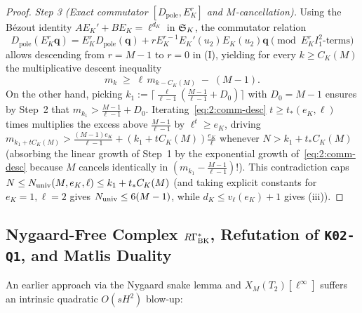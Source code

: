 \begin{proof}
\emph{Step 3 (Exact commutator $[D_{\mathrm{pole}}, E_K^r]$ and $M$-cancellation).} Using the B\'ezout identity $A E_K' + B E_K = \ell^{d_K}$ in $\mathfrak{S}_K$, the commutator relation
\[
  D_{\mathrm{pole}}(E_K^r \mathbf{q}) = E_K^r D_{\mathrm{pole}}(\mathbf{q}) + r E_K^{r-1} E_K'(u_2) E_K(u_2)\mathbf{q} \pmod{E_K^r I_1^2\text{-terms}}
\]
allows descending from $r = M-1$ to $r = 0$ in (I), yielding for every $k \ge C_K(M)$ the multiplicative descent inequality
\begin{equation}\label{eq:2:comm-desc}
  m_k \;\ge\; \ell\, m_{k - C_K(M)} \;-\; (M - 1).
\end{equation}
On the other hand, picking $k_1 := \lceil \frac{\ell}{\ell-1}(\frac{M-1}{\ell-1} + D_0)\rceil$ with $D_0 = M - 1$ ensures by Step~2 that $m_{k_1} > \frac{M-1}{\ell-1} + D_0$. Iterating~\eqref{eq:2:comm-desc} $t \ge t_*(e_K, \ell)$ times multiplies the excess above $\frac{M-1}{\ell-1}$ by $\ell^t \ge e_K$, driving $m_{k_1 + t C_K(M)} > \frac{(M-1)e_K}{\ell-1} + (k_1 + t C_K(M)) \frac{e_K}{\ell}$ whenever $N > k_1 + t_* C_K(M)$ (absorbing the linear growth of Step~1 by the exponential growth of~\eqref{eq:2:comm-desc} because $M$ cancels identically in $(m_{k_1} - \frac{M-1}{\ell-1})$!). This contradiction caps $N \le N_{\mathrm{univ}}(M, e_K, \ell) \le k_1 + t_* C_K(M)$ (and taking explicit constants for $e_K = 1, \ell = 2$ gives $N_{\mathrm{univ}} \le 6(M-1)$, while $d_K \le v_\ell(e_K)+1$ gives (iii)).
\end{proof}

\subsection{Nygaard-Free Complex $R\Gamma_{\mathrm{BK}}^*$, Refutation of \texttt{K02-Q1}, and Matlis Duality}\label{sec:2:rbk}

An earlier approach via the Nygaard snake lemma and $X_M(T_2)[\ell^\infty]$ suffers an intrinsic quadratic $O(s H^2)$ blow-up:


